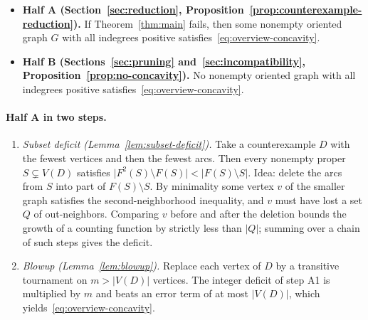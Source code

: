 \documentclass[11pt]{article}
\theoremstyle{remark}
\newcommand{\abs}[1]{\lvert #1\rvert}
\begin{document}
\begin{itemize}[leftmargin=2em]
\item \textbf{Half A (Section~\ref{sec:reduction},
Proposition~\ref{prop:counterexample-reduction}).} If
Theorem~\ref{thm:main} fails, then some nonempty oriented graph $G$ with all
indegrees positive satisfies~\eqref{eq:overview-concavity}.
\item \textbf{Half B (Sections~\ref{sec:pruning}
and~\ref{sec:incompatibility}, Proposition~\ref{prop:no-concavity}).} No
nonempty oriented graph with all indegrees positive
satisfies~\eqref{eq:overview-concavity}.
\end{itemize}

\paragraph{Half A in two steps.}
\begin{enumerate}[label=\textbf{A\arabic*.},leftmargin=3em]
\item \emph{Subset deficit (Lemma~\ref{lem:subset-deficit}).} Take a
counterexample $D$ with the fewest vertices and then the fewest arcs. Then
every nonempty proper $S\subsetneq V(D)$ satisfies
$\abs{F^2(S)\setminus F(S)}<\abs{F(S)\setminus S}$. Idea: delete the arcs from
$S$ into part of $F(S)\setminus S$. By minimality some vertex $v$ of the
smaller graph satisfies the second-neighborhood inequality, and $v$ must have
lost a set $Q$ of out-neighbors. Comparing $v$ before and after the deletion
bounds the growth of a counting function by strictly less than $\abs Q$;
summing over a chain of such steps gives the deficit.
\item \emph{Blowup (Lemma~\ref{lem:blowup}).} Replace each vertex of $D$ by a
transitive tournament on $m>\abs{V(D)}$ vertices. The integer deficit of
step A1 is multiplied by $m$ and beats an error term of at most
$\abs{V(D)}$, which yields~\eqref{eq:overview-concavity}.
\end{enumerate}
\end{document}
